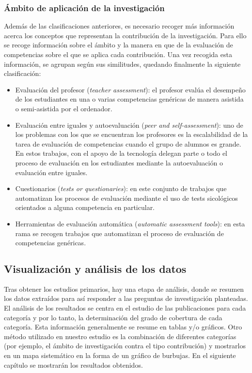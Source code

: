 \subsubsection{Ámbito de aplicación de la investigación}
Además de las clasificaciones anteriores, es necesario recoger más información acerca los conceptos que representan la contribución de la investigación. Para ello se recoge información sobre el ámbito y la manera en que de la evaluación de competencias sobre el que se aplica cada contribución. Una vez recogida esta información, se agrupan según sus similitudes, quedando finalmente la siguiente clasificación:
\begin{itemize}
\item Evaluación del profesor (\emph{teacher assessment}): el profesor evalúa el desempeño de los estudiantes en una o varias competencias genéricas de manera asistida o semi-asistida por el ordenador.
\item Evaluación entre iguales y autoevaluación (\emph{peer and self-assessment}): uno de los problemas con los que se encuentran los profesores es la escalabilidad de la tarea de evaluación de competencias cuando el grupo de alumnos es grande. En estos trabajos, con el apoyo de la tecnología delegan parte o todo el proceso de evaluación en los estudiantes mediante la autoevaluación o evaluación entre iguales.
\item Cuestionarios (\emph{tests or questionaries}): en este conjunto de trabajos que automatizan los procesos de evaluación mediante el uso de tests sicológicos orientados a alguna competencia en particular.
\item Herramientas de evaluación automática (\emph{automatic assessment tools}): en esta rama se recogen trabajos que automatizan el proceso de evaluación de competencias genéricas.
\end{itemize}

\subsection{Visualización y análisis de los datos}
Tras obtener los estudios primarios, hay una etapa de análisis, donde se resumen los datos extraídos para así responder a las preguntas de investigación planteadas. El análisis de los resultados se centra en el estudio de las publicaciones para cada categoría y por lo tanto, la determinación del grado de cobertura de cada categoría. Esta información generalmente se resume en tablas y/o gráficos. Otro método utilizado en nuestro estudio es la combinación de diferentes categorías (por ejemplo, el ámbito de investigación contra el tipo contribución) y mostrarlos en un mapa sistemático en la forma de un gráfico de burbujas.
En el siguiente capítulo se mostrarán los resultados obtenidos.

